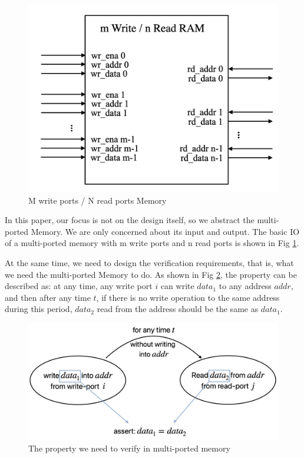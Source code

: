 \documentclass[conference]{IEEEtran}
\theoremstyle{definition}
\begin{document}
\begin{figure}[!htbp]
    \begin{center}
    \includegraphics[width=0.9\linewidth]{pics/mpmemoryio.png}
    \caption{M write ports / N read ports Memory}
    \label{fig: mpmemoryio}
    \end{center}
\end{figure}

In this paper, our focus is not on the design itself, so we abstract the multi-ported Memory.
We are only concerned about its input and output. The basic IO of a multi-ported memory with m write ports and n read ports is shown in Fig \ref{fig: mpmemoryio}.

At the same time, we need to design the verification requirements, that is, what we need the multi-ported Memory to do. As shown in Fig \ref{fig: memverify}, the property can be described as: at any time, any write port $i$ can write $data_1$ to any address $addr$, and then after any time $t$, if there is no write operation to the same address during this period, $data_2$ read from the address should be the same as $data_1$.

\begin{figure}[!htbp]
    \begin{center}
    \includegraphics[width=1\linewidth]{pics/memverify.png}
    \caption{The property we need to verify in multi-ported memory}
    \label{fig: memverify}
    \end{center}
\end{figure}
\end{document}
